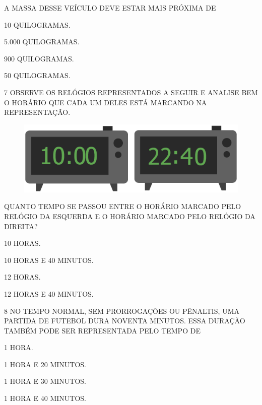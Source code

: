 \pagebreak

A MASSA DESSE VEÍCULO DEVE ESTAR MAIS PRÓXIMA DE

\begin{escolha}[itemsep=0pt]
\item 10 QUILOGRAMAS.

\item 5.000 QUILOGRAMAS.

\item 900 QUILOGRAMAS.

\item 50 QUILOGRAMAS.
\end{escolha}


\num{7} OBSERVE OS RELÓGIOS REPRESENTADOS A SEGUIR E ANALISE BEM O HORÁRIO QUE CADA UM DELES ESTÁ MARCANDO NA REPRESENTAÇÃO.

\begin{figure}[H]
\centering
\includegraphics[width=\textwidth]{./media/SAEB_1ANO_MAT_FIGURA139.png}
\end{figure}

QUANTO TEMPO SE PASSOU ENTRE O HORÁRIO MARCADO PELO RELÓGIO DA ESQUERDA E O HORÁRIO MARCADO PELO RELÓGIO DA DIREITA?

\begin{escolha}%
\item 10 HORAS.

\item 10 HORAS E 40 MINUTOS.

\item 12 HORAS.

\item 12 HORAS E 40 MINUTOS.
\end{escolha}

\num{8} NO TEMPO NORMAL, SEM PRORROGAÇÕES OU PÊNALTIS, UMA PARTIDA DE FUTEBOL DURA NOVENTA MINUTOS. ESSA DURAÇÃO TAMBÉM PODE SER
REPRESENTADA PELO TEMPO DE

\begin{escolha}%
\item 1 HORA.

\item 1 HORA E 20 MINUTOS.

\item 1 HORA E 30 MINUTOS.

\item 1 HORA E 40 MINUTOS.
\end{escolha}

